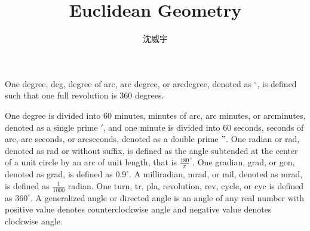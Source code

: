 \documentclass[a4paper,12pt]{report}
\begin{document}
\title{Euclidean Geometry}
\author{沈威宇}
\date{\temtoday}
\titletocdoc
{}
One degree, deg, degree of arc, arc degree, or arcdegree, denoted as $^\circ$, is defined such that one full revolution is 360 degrees.

One degree is divided into 60 minutes, minutes of arc, arc minutes, or arcminutes, denoted as a single prime $'$, and one minute is divided into 60 seconds, seconds of arc, arc seconds, or arcseconds, denoted as a double prime $"$.
One radian or rad, denoted as rad or without suffix, is defined as the angle subtended at the center of a unit circle by an arc of unit length, that is $\frac{180}{\pi}^\circ$.
One gradian, grad, or gon, denoted as grad, is defined as $0.9^\circ$.
A milliradian, mrad, or mil, denoted as mrad, is defined as $\frac{1}{1000}$ radian.
One turn, tr, pla, revolution, rev, cycle, or cyc is defined as $360^\circ$.
A generalized angle or directed angle is an angle of any real number with positive value denotes counterclockwise angle and negative value denotes clockwise angle.
\end{document}
